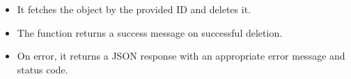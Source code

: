 \documentclass[letterpaper,10pt,english]{sphinxmanual}
\begin{document}
\begin{fulllineitems}
\begin{description}
\begin{itemize}
\item {} 
\sphinxAtStartPar
It fetches the  object by the provided ID and deletes it.

\item {} 
\sphinxAtStartPar
The function returns a success message on successful deletion.

\item {} 
\sphinxAtStartPar
On error, it returns a JSON response with an appropriate error message and status code.

\end{itemize}

\end{description}

\end{fulllineitems}

\end{document}
